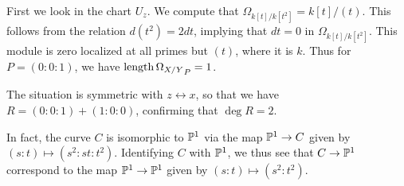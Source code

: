\documentclass[11pt, english]{article}
\begin{document}
First we look in the chart $U_z$. We compute that $\Omega_{k[t]/k[t^2]} = k[t]/(t)$. This follows from the relation $d(t^2)=2dt$, implying that $dt=0$ in $\Omega_{k[t]/k[t^2]}$. This module is zero localized at all primes but $(t)$, where it is $k$. Thus for $P=(0:0:1)$, we have $\mathrm{length} \, {\Omega_{X/Y}}_P = 1$.

The situation is symmetric with $z \leftrightarrow x$, so that we have $R = (0:0:1) + (1:0:0)$, confirming that $\deg R=2$. 

In fact, the curve $C$ is isomorphic to $\mathbb{P}^1$ via the map $\mathbb{P}^1 \to C$ given by $(s:t) \mapsto (s^2:st:t^2)$. Identifying $C$ with $\mathbb{P}^1$, we thus see that $C \to \mathbb{P}^1$ correspond to the map $\mathbb{P}^1 \to \mathbb{P}^1$ given by $(s:t) \mapsto (s^2:t^2)$. 





\end{document}
